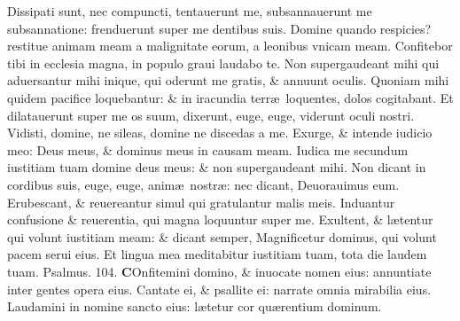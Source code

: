 \documentclass[a5paper,10pt]{book}
\def\ae{æ}
\begin{document}
\begin{multicols*}{2}
\newline \color{red} D\color{black}issipati sunt, nec compuncti, tentauerunt me, subsannauerunt me subsannatione: frenduerunt super me dentibus suis.
\newline \color{red} D\color{black}omine quando respicies? restitue animam meam a malignitate eorum, a leonibus vnicam meam.
\newline \color{red} C\color{black}onfitebor tibi in ecclesia magna, in populo graui laudabo te.
\newline \color{red} N\color{black}on supergaudeant mihi qui aduersantur mihi inique, qui oderunt me gratis, \& annuunt oculis.
\newline \color{red} Q\color{black}uoniam mihi quidem pacifice loquebantur: \& in iracundia terr\ae \ loquentes, dolos cogitabant.
\newline \color{red} E\color{black}t dilatauerunt super me os suum, dixerunt, euge, euge, viderunt oculi nostri.
\newline \color{red} V\color{black}idisti, domine, ne sileas, domine ne discedas a me.
\newline \color{red} E\color{black}xurge, \& intende iudicio meo: Deus meus, \& dominus meus in causam meam.
\newline \color{red} I\color{black}udica me secundum iustitiam tuam domine deus meus: \& non supergaudeant mihi.
\newline \color{red} N\color{black}on dicant in cordibus suis, euge, euge, anim\ae \ nostr\ae : nec dicant, Deuorauimus eum.
\newline \color{red} E\color{black}rubescant, \& reuereantur simul qui gratulantur malis meis.
\newline \color{red} I\color{black}nduantur confusione \& reuerentia, qui magna loquuntur super me.
\newline \color{red} E\color{black}xultent, \& l\ae tentur qui volunt iustitiam meam: \& dicant semper, Magnificetur dominus, qui volunt pacem serui eius.
\newline \color{red} E\color{black}t lingua mea meditabitur iustitiam tuam, tota die laudem tuam.
\newline \color{red} Psalmus. 104. \color{black}
\vspace{-.5em}
\lettrine[lines=2]{\bfseries \color{red} C}{}Onfitemini domino, \& inuocate nomen eius: annuntiate inter gentes opera eius.
\newline \color{red} C\color{black}antate ei, \& psallite ei: narrate omnia mirabilia eius.
\newline \color{red} L\color{black}audamini in nomine sancto eius: l\ae tetur cor qu\ae rentium dominum.

\end{multicols*}
\end{document}
